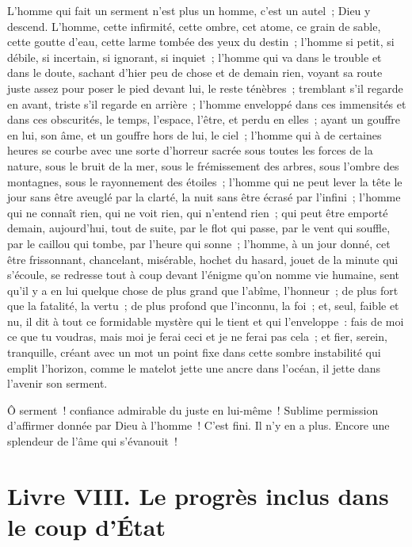 \documentclass[french,twoside]{book} %
\begin{document}
L’homme qui fait un serment n’est plus un homme, c’est un autel ; Dieu y descend. L’homme, cette infirmité, cette ombre, cet atome, ce grain de sable, cette goutte d’eau, cette larme tombée des yeux du destin ; l’homme si petit, si débile, si incertain, si ignorant, si inquiet ; l’homme qui va dans le trouble et dans le doute, sachant d’hier peu de chose et de demain rien, voyant sa route juste assez pour poser le pied devant lui, le reste ténèbres ; tremblant s’il regarde en avant, triste s’il regarde en arrière ; l’homme enveloppé dans ces immensités et dans ces obscurités, le temps, l’espace, l’être, et perdu en elles ; ayant un gouffre en lui, son âme, et un gouffre hors de lui, le ciel ; l’homme qui à de certaines heures se courbe avec une sorte d’horreur sacrée sous toutes les forces de la nature, sous le bruit de la mer, sous le frémissement des arbres, sous l’ombre des montagnes, sous le rayonnement des étoiles ; l’homme qui ne peut lever la tête le jour sans être aveuglé par la clarté, la nuit sans être écrasé par l’infini ; l’homme qui ne connaît rien, qui ne voit rien, qui n’entend rien ; qui peut être emporté demain, aujourd’hui, tout de suite, par le flot qui passe, par le vent qui souffle, par le caillou qui tombe, par l’heure qui sonne ; l’homme, à un jour donné, cet être frissonnant, chancelant, misérable, hochet du hasard, jouet de la minute qui s’écoule, se redresse tout à coup devant l’énigme qu’on nomme vie humaine, sent qu’il y a en lui quelque chose de plus grand que l’abîme, l’honneur ; de plus fort que la fatalité, la vertu ; de plus profond que l’inconnu, la foi ; et, seul, faible et nu, il dit à tout ce formidable mystère qui le tient et qui l’enveloppe : fais de moi ce que tu voudras, mais moi je ferai ceci et je ne ferai pas cela ; et fier, serein, tranquille, créant avec un mot un point fixe dans cette sombre instabilité qui emplit l’horizon, comme le matelot jette une ancre dans l’océan, il jette dans l’avenir son serment.\par
Ô serment ! confiance admirable du juste en lui-même ! Sublime permission d’affirmer donnée par Dieu à l’homme ! C’est fini. Il n’y en a plus. Encore une splendeur de l’âme qui s’évanouit !
\section[{Livre VIII. Le progrès inclus dans le coup d’État}]{Livre VIII. Le progrès inclus dans le coup d’État}\renewcommand{\leftmark}{Livre VIII. Le progrès inclus dans le coup d’État}
\end{document}
